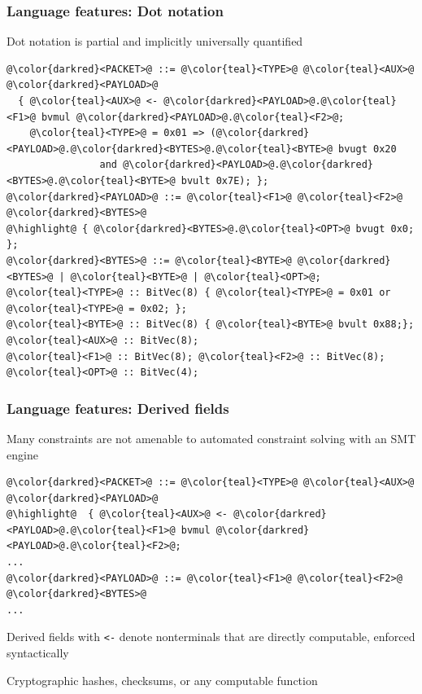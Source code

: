 \documentclass[11pt,xcolor={dvipsnames},hyperref={pdftex,pdfpagemode=UseNone,hidelinks,pdfdisplaydoctitle=true},usepdftitle=false]{beamer}
\newcommand{\green}[1]{\textcolor{green!60!black}{#1}}
\newcommand{\blue}[1]{\textcolor{blue!70!black}{#1}}
\begin{document}
\begin{frame}[fragile]
    \frametitle{Language features: Dot notation}\pause
Dot notation is \green{partial} and \green{implicitly universally quantified}\\[4pt]
\begin{lstlisting}[style=goblin]
@\color{darkred}<PACKET>@ ::= @\color{teal}<TYPE>@ @\color{teal}<AUX>@ @\color{darkred}<PAYLOAD>@
  { @\color{teal}<AUX>@ <- @\color{darkred}<PAYLOAD>@.@\color{teal}<F1>@ bvmul @\color{darkred}<PAYLOAD>@.@\color{teal}<F2>@;
    @\color{teal}<TYPE>@ = 0x01 => (@\color{darkred}<PAYLOAD>@.@\color{darkred}<BYTES>@.@\color{teal}<BYTE>@ bvugt 0x20 
                and @\color{darkred}<PAYLOAD>@.@\color{darkred}<BYTES>@.@\color{teal}<BYTE>@ bvult 0x7E); };
@\color{darkred}<PAYLOAD>@ ::= @\color{teal}<F1>@ @\color{teal}<F2>@ @\color{darkred}<BYTES>@ 
@\highlight@ { @\color{darkred}<BYTES>@.@\color{teal}<OPT>@ bvugt 0x0; };
@\color{darkred}<BYTES>@ ::= @\color{teal}<BYTE>@ @\color{darkred}<BYTES>@ | @\color{teal}<BYTE>@ | @\color{teal}<OPT>@;
@\color{teal}<TYPE>@ :: BitVec(8) { @\color{teal}<TYPE>@ = 0x01 or @\color{teal}<TYPE>@ = 0x02; };   
@\color{teal}<BYTE>@ :: BitVec(8) { @\color{teal}<BYTE>@ bvult 0x88;}; 
@\color{teal}<AUX>@ :: BitVec(8); 
@\color{teal}<F1>@ :: BitVec(8); @\color{teal}<F2>@ :: BitVec(8); @\color{teal}<OPT>@ :: BitVec(4); 
\end{lstlisting}
\end{frame}

\begin{frame}[fragile]
    \frametitle{Language features: Derived fields}\pause
Many constraints are not amenable to \green{automated constraint solving} 
with an \green{SMT engine}\\[4pt]
\begin{lstlisting}[style=goblin]
@\color{darkred}<PACKET>@ ::= @\color{teal}<TYPE>@ @\color{teal}<AUX>@ @\color{darkred}<PAYLOAD>@
@\highlight@  { @\color{teal}<AUX>@ <- @\color{darkred}<PAYLOAD>@.@\color{teal}<F1>@ bvmul @\color{darkred}<PAYLOAD>@.@\color{teal}<F2>@;
...
@\color{darkred}<PAYLOAD>@ ::= @\color{teal}<F1>@ @\color{teal}<F2>@ @\color{darkred}<BYTES>@ 
...
\end{lstlisting}\pause
\green{Derived fields} with \blue{\scriptsize\texttt{<-}} denote nonterminals that are directly computable, enforced syntactically \pause

Cryptographic hashes, checksums, or \green{any computable function}
\end{frame}
\end{document}
